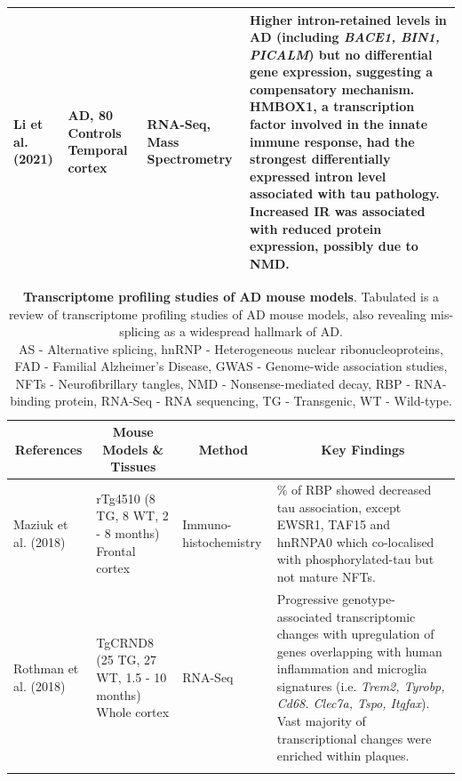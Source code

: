 \begin{landscape}
\begin{longtable}[c]{p{3cm}p{4cm}p{3cm}p{16cm}}
		\centering Li et al. (2021) \cite{Li2021} &
		\centering 84 AD, 80 Controls \newline Temporal cortex &
		\centering RNA-Seq, Mass Spectrometry &
		\tabitem Higher intron-retained levels in AD (including \textit{BACE1, BIN1, PICALM}) but no differential gene expression, suggesting a compensatory mechanism. \newline
		\tabitem HMBOX1, a transcription factor involved in the innate immune response, had the strongest differentially expressed intron level associated with tau pathology. \newline
		\tabitem Increased IR was associated with reduced protein expression, possibly due to NMD. \\* \bottomrule
	\end{longtable}

	\clearpage
	\begin{longtable}[c]{p{3cm}p{4cm}p{3cm}p{16cm}}
		\caption[Transcriptome profiling studies of AD mouse models]%
		{\textbf{Transcriptome profiling studies of AD mouse models}. Tabulated is a review of transcriptome profiling studies of AD mouse models, also revealing mis-splicing as a widespread hallmark of AD. \newline AS - Alternative splicing, hnRNP - Heterogeneous nuclear ribonucleoproteins, FAD - Familial Alzheimer's Disease, GWAS - Genome-wide association studies, NFTs - Neurofibrillary tangles, NMD - Nonsense-mediated decay, RBP - RNA-binding protein, RNA-Seq - RNA sequencing, TG - Transgenic, WT - Wild-type.}
		\label{tab: AS_ADMouse_studies}\\
		\toprule
		\multicolumn{1}{c}{References} &
		\multicolumn{1}{c}{Mouse Models \& Tissues} &
		\multicolumn{1}{c}{Method} &
		\multicolumn{1}{c}{Key Findings} \\* \midrule
		\endfirsthead			\endhead			\bottomrule			\endfoot			\endlastfoot	
		
		\centering Maziuk et al. (2018)\cite{Maziuk2018} &
		\centering rTg4510 (8 TG, 8 WT, 2 - 8 months) Frontal cortex&
		\centering Immuno-\newline histochemistry &
		\tabitem 65\% of RBP showed decreased tau association, except EWSR1, TAF15 and hnRNPA0 which co-localised with phosphorylated-tau but not mature NFTs. \\
		\hdashline[0.5pt/5pt]
		
		\centering Rothman et al. (2018)\cite{Rothman2018}&
		\centering TgCRND8 (25 TG, 27 WT, 1.5 - 10 months) \newline Whole cortex&
		\centering RNA-Seq &
		\tabitem Progressive genotype-associated transcriptomic changes with upregulation of genes overlapping with human inflammation and microglia signatures (i.e. \textit{Trem2, Tyrobp, Cd68. Clec7a, Tspo, Itgfax}). \newline
		\tabitem Vast majority of transcriptional changes were enriched within plaques.  \\
		\hdashline[0.5pt/5pt]
		

\end{longtable}
\end{landscape}
